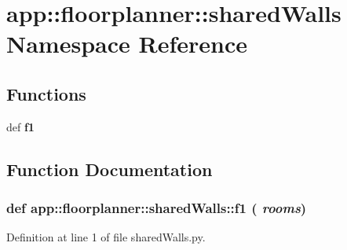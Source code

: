 \section{app::floorplanner::sharedWalls Namespace Reference}
\label{namespaceapp_1_1floorplanner_1_1sharedWalls}


\subsection*{Functions}
\begin{CompactItemize}
\item 
def {\bf f1}
\end{CompactItemize}


\subsection{Function Documentation}
\subsubsection{\setlength{\rightskip}{0pt plus 5cm}def app::floorplanner::sharedWalls::f1 ( {\em rooms})}\label{namespaceapp_1_1floorplanner_1_1sharedWalls_a197459574b0277fa300a1a1a3c4b472}




Definition at line 1 of file sharedWalls.py.